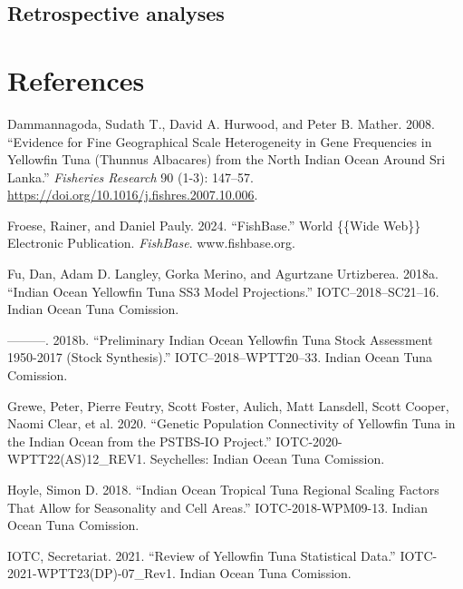 \documentclass[
]{scrartcl}
\newlength{\cslhangindent}
\newenvironment{CSLReferences}[2] %
 {\begin{list}{}{%
  \setlength{\itemindent}{0pt}
  \setlength{\leftmargin}{0pt}
  \setlength{\parsep}{0pt}
  \ifodd #1
   \setlength{\leftmargin}{\cslhangindent}
   \setlength{\itemindent}{-1\cslhangindent}
  \fi
  \setlength{\itemsep}{#2\baselineskip}}}
 {\end{list}}
\begin{document}
\subsection{Retrospective analyses}\label{retrospective-analyses}

\newpage{}

\section*{References}\label{references}

\label{refs}
\begin{CSLReferences}{1}{0}
Dammannagoda, Sudath T., David A. Hurwood, and Peter B. Mather. 2008.
{``Evidence for Fine Geographical Scale Heterogeneity in Gene
Frequencies in Yellowfin Tuna ({Thunnus} Albacares) from the North
{Indian Ocean} Around {Sri Lanka}.''} \emph{Fisheries Research} 90
(1-3): 147--57. \url{https://doi.org/10.1016/j.fishres.2007.10.006}.

Froese, Rainer, and Daniel Pauly. 2024. {``{FishBase}.''} World \{\{Wide
Web\}\} Electronic Publication. \emph{FishBase}. www.fishbase.org.

Fu, Dan, Adam D. Langley, Gorka Merino, and Agurtzane Urtizberea. 2018a.
{``Indian {Ocean Yellowfin Tuna SS3 Model Projections}.''}
IOTC--2018--SC21--16. Indian Ocean Tuna Comission.

---------. 2018b. {``Preliminary {Indian Ocean Yellowfin Tuna Stock
Assessment} 1950-2017 ({Stock Synthesis}).''} IOTC--2018--WPTT20--33.
Indian Ocean Tuna Comission.

Grewe, Peter, Pierre Feutry, Scott Foster, Aulich, Matt Lansdell, Scott
Cooper, Naomi Clear, et al. 2020. {``Genetic Population Connectivity of
Yellowfin Tuna in the {Indian Ocean} from the {PSTBS-IO Project}.''}
IOTC-2020-WPTT22(AS)12\_REV1. Seychelles: Indian Ocean Tuna Comission.

Hoyle, Simon D. 2018. {``Indian {Ocean} Tropical Tuna Regional Scaling
Factors That Allow for Seasonality and Cell Areas.''}
IOTC-2018-WPM09-13. Indian Ocean Tuna Comission.

IOTC, Secretariat. 2021. {``Review of {Yellowfin Tuna Statistical
Data}.''} IOTC-2021-WPTT23(DP)-07\_Rev1. Indian Ocean Tuna Comission.


\end{CSLReferences}
\end{document}
